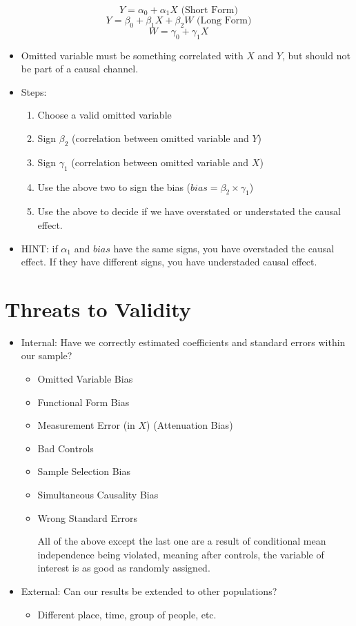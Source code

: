 \documentclass{article}
\begin{document}
$$Y = \alpha_0 + \alpha_1 X \mbox{ (Short Form)}$$
$$Y = \beta_0 + \beta_1 X + \beta_2 W \mbox{ (Long Form)}$$
$$W = \gamma_0 + \gamma_1 X$$

\begin{itemize}
    \item Omitted variable must be something correlated with $X$ and $Y$, but should not be part of a causal channel.
    \item Steps:
    \begin{enumerate}
        \item Choose a valid omitted variable
        \item Sign $\beta_2$ (correlation between omitted variable and $Y$)
        \item Sign $\gamma_1$ (correlation between omitted variable and $X$)
        \item Use the above two to sign the bias ($bias = \beta_2 \times \gamma_1$)
        \item Use the above to decide if we have overstated or understated the causal effect.
    \end{enumerate}
    \item HINT: if $\alpha_1$ and $bias$ have the same signs, you have overstaded the causal effect. If they have different signs, you have understaded causal effect.
\end{itemize}

\section{Threats to Validity}
\begin{itemize}
    \item Internal: Have we correctly estimated coefficients and standard errors within our sample?
    \begin{itemize}
        \item Omitted Variable Bias
        \item Functional Form Bias
        \item Measurement Error (in $X$) (Attenuation Bias)
        \item Bad Controls
        \item Sample Selection Bias
        \item Simultaneous Causality Bias
        \item Wrong Standard Errors

        All of the above except the last one are a result of conditional mean independence being violated, meaning after controls, the variable of interest is as good as randomly assigned.
    \end{itemize}
    \item External: Can our results be extended to other populations?
    \begin{itemize}
        \item Different place, time, group of people, etc.
    \end{itemize}
\end{itemize}
\end{document}
